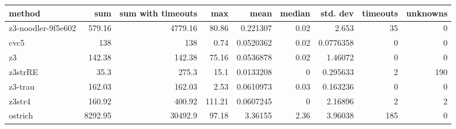 \begin{tabular}{lrrrrrrrr}
\hline
 method             &     sum &   sum with timeouts &    max &      mean &   median &   std. dev &   timeouts &   unknowns \\
\hline
 z3-noodler-9f5e602 &  579.16 &             4779.16 &  80.86 & 0.221307  &     0.02 &  2.653     &         35 &          0 \\
 cvc5               &  138    &              138    &   0.74 & 0.0520362 &     0.02 &  0.0776358 &          0 &          0 \\
 z3                 &  142.38 &              142.38 &  75.16 & 0.0536878 &     0.02 &  1.46072   &          0 &          0 \\
 z3strRE            &   35.3  &              275.3  &  15.1  & 0.0133208 &     0    &  0.295633  &          2 &        190 \\
 z3-trau            &  162.03 &              162.03 &   2.53 & 0.0610973 &     0.03 &  0.163236  &          0 &          0 \\
 z3str4             &  160.92 &              400.92 & 111.21 & 0.0607245 &     0    &  2.16896   &          2 &          2 \\
 ostrich            & 8292.95 &            30492.9  &  97.18 & 3.36155   &     2.36 &  3.96038   &        185 &          0 \\
\hline
\end{tabular}

